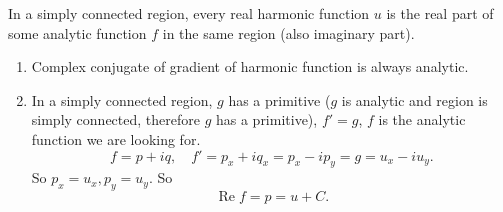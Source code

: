\begin{theorem}
	In a simply connected region, every real harmonic function $u$ is the real part of some analytic function $f$ in the same region (also imaginary part).
\end{theorem}

\begin{enumerate}
	\item Complex conjugate of gradient of harmonic function is always analytic.
	\item In a simply connected region, $g$ has a primitive ($g$ is analytic and region is simply connected, therefore $g$ has a primitive), $f' = g$, $f$ is the analytic function we are looking for.
		\[
			f = p + i q, \quad f' = p_x + i q_x = p_x - i p_y = g = u_x - i u_y
		.\] 
		So $p_x = u_x, p_y = u_y$. So \[
			\operatorname{Re} f = p = u + C
		.\] 
\end{enumerate}
